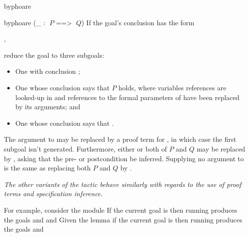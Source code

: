 \begin{tactic}{byphoare}
  \begin{tsyntax}{byphoare (_ : $\;P$ ==> $\;Q$)}
    If the goal's conclusion has the form
    \begin{center}
      ,
    \end{center}
    reduce the goal to three subgoals:
    \begin{itemize}
    \item One with conclusion
      ;

    \item One whose conclusion says that $P$ holds, where
      variables references are looked-up in  and
      references to the formal parameters of 
      have been replaced by its arguments; and

    \item One whose conclusion says that .
    \end{itemize}

    The argument to  may be replaced by a proof term for
    , in which case the
    first subgoal isn't generated.  Furthermore, either or both of $P$
    and $Q$ may be replaced by \ec{_}, asking that the pre- or
    postcondition be inferred.  Supplying no argument to 
    is the same as replacing both $P$ and $Q$ by \ec{_}.

    \medskip
    \emph{The other variants of the tactic behave similarly with
    regards to the use of proof terms and specification inference.}

    \medskip For example, consider the module
    If the current goal is
     then
    running 
    produces the goals
    and
    and
    Given the lemma
    if the current goal is
     then
    running 
    produces the goals
    and
  \end{tsyntax}


\end{tactic}
